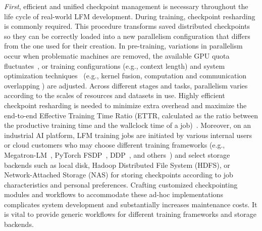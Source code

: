 \textit{First}, efficient and unified checkpoint management is necessary throughout the life cycle of real-world LFM development.
During training, checkpoint resharding is commonly required. 
This procedure transforms saved distributed checkpoints so they can be correctly loaded into a new parallelism configuration that differs from the one used for their creation.
In pre-training, variations in parallelism occur when problematic machines are removed, the available GPU quota fluctuates~\cite{qsync,lyra}, or training configurations (e.g., context length) and system optimization techniques~\cite{megascale} (e.g., kernel fusion, computation and communication overlapping
) are adjusted.
Across different stages and tasks, parallelism varies according to the scales of resources and datasets in use.
Highly efficient checkpoint resharding is needed to minimize extra overhead and maximize the end-to-end Effective Training Time Ratio (ETTR, calculated as the ratio between the productive training time and the wallclock time of a job)~\cite{meta-cluster}.
Moreover, on an industrial AI platform, LFM training jobs are initiated by various internal users or cloud customers who may choose different training frameworks (e.g., Megatron-LM~\cite{megatron}, PyTorch FSDP~\cite{fsdp}, DDP~\cite{ddp}, and others~\cite{vescale}) and select storage backends such as local disk, Hadoop Distributed File System (HDFS), or Network-Attached Storage (NAS) for storing checkpoints according to job characteristics and personal preferences.
Crafting customized checkpointing modules and workflows to accommodate these ad-hoc implementations complicates system development and substantially increases maintenance costs. It is vital to provide generic workflows for different training frameworks and storage backends.

